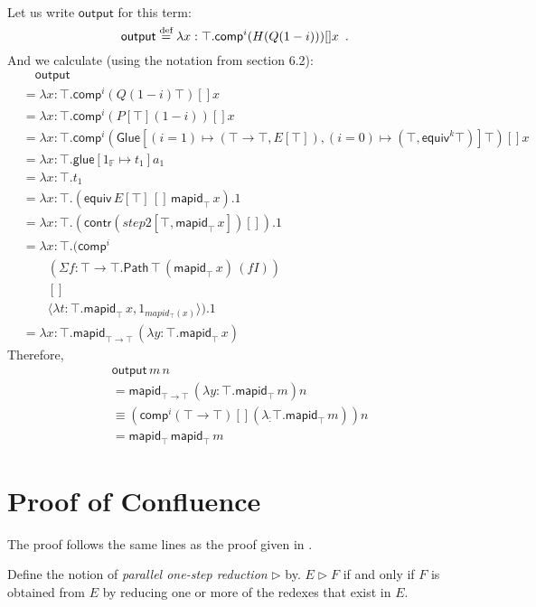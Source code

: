 \documentclass[a4paper,UKenglish]{lipics-v2016}
\newcommand*{\eqdef}{\mathrel{\smash{\stackrel{\text{def}}{=}}}}
\newcommand{\Path}[3]{\ensuremath{\mathsf{Path} \, {#1} \, {#2} \, {#3}}}
\newcommand{\outputt}{\mathsf{output}}
\newcommand{\mapid}[2]{\mathsf{mapid}_{#1} \, {#2}}
\newcommand{\comp}{\mathsf{comp}}
\theoremstyle{plain}
\theoremstyle{definition}
\begin{document}
Let us write $\outputt$ for this term:
$$ \outputt \eqdef \lambda x : \top. \comp^i (H (Q (1 - i))) [] x \enspace . $$
And we calculate (using the notation from \cite{cchm:cubical} section 6.2):
\begin{align*}
& \quad \outputt \\
& = \lambda x : \top. \comp^i (Q (1 - i) \top) [] x \\
& = \lambda x : \top. \comp^i (P[\top] (1 - i)) [] x \\
& = \lambda x : \top. \comp^i (\mathsf{Glue}[(i = 1) \mapsto (\top \rightarrow \top, E[\top]), (i = 0) \mapsto (\top, \mathsf{equiv}^k \top)] \top) [] x \\
& = \lambda x : \top. \mathsf{glue} [ 1_\mathbb{F} \mapsto t_1 ] a_1 \\
& = \lambda x : \top. t_1 \\
& = \lambda x : \top. (\mathsf{equiv} \, E[\top] \, [] \, \mapid{\top}{x}).1 \\
& = \lambda x : \top. (\mathsf{contr} (step2[\top, \mapid{\top}{x}]) []).1 \\
& = \lambda x : \top. (\comp^i \\
& \qquad (\Sigma f : \top \rightarrow \top. \Path{\top}{(\mapid{\top}{x})}{(fI)}) \\
& \qquad [] \\
& \qquad \langle \lambda t : \top. \mapid{\top}{x}, 1_{mapid_\top(x)} \rangle).1 \\
& = \lambda x : \top. \mapid{\top \rightarrow \top}{(\lambda y : \top. \mapid{\top}{x})}
\end{align*}
Therefore,
\begin{align*}
& \outputt \, m \, n \\
& = \mapid{\top \rightarrow \top}{(\lambda y : \top. \mapid{\top}{m})} n \\
& \equiv (\comp^i (\top \rightarrow \top) [] (\lambda _ : \top. \mapid{\top}{m})) n \\
& = \mapid{\top}{\mapid{\top}{m}}
\end{align*}

\section{Proof of Confluence}
\label{section:confluence}

The proof follows the same lines as the proof given in \cite{luo:car}.

Define the notion of \emph{parallel one-step reduction} $\rhd$ by. $E \rhd F$ if and only if
$F$ is obtained from $E$ by reducing one or more of the redexes that exist in $E$.  
\end{document}
